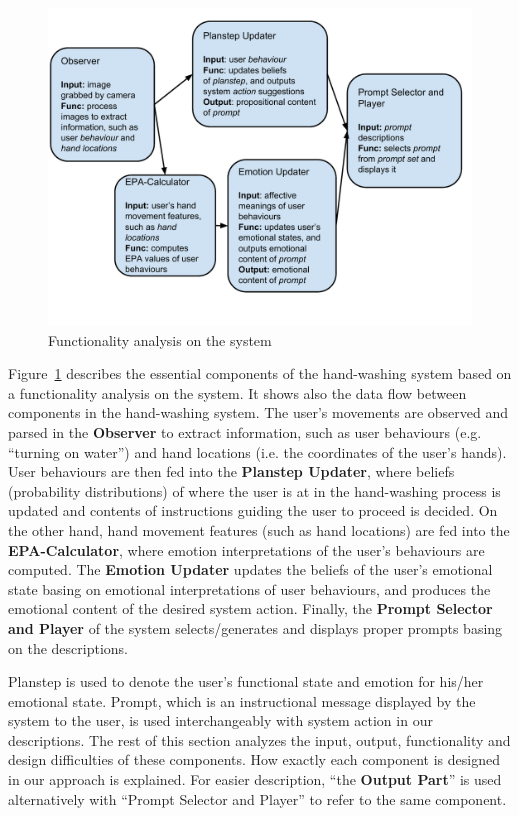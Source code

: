 \begin{figure}[h!]
\centering
\includegraphics[width=0.9\linewidth]{fig-components.pdf}
\caption{Functionality analysis on the system}
\label{fig:components}
\end{figure}

Figure~\ref{fig:components} describes the essential components of the hand-washing system based on a functionality analysis on the system. It shows also the data flow between components in the hand-washing system. The user's movements are observed and parsed in the \textbf{Observer} to extract information, such as user behaviours (e.g. ``turning on water'') and hand locations (i.e. the coordinates of the user's hands). User behaviours are then fed into the \textbf{Planstep Updater}, where beliefs (probability distributions) of where the user is at in the hand-washing process is updated and contents of instructions guiding the user to proceed is decided. On the other hand, hand movement features (such as hand locations) are fed into the \textbf{EPA-Calculator}, where emotion interpretations of the user's behaviours are computed. The \textbf{Emotion Updater} updates the beliefs of the user's emotional state basing on emotional interpretations of user behaviours, and produces the emotional content of the desired system action. Finally, the \textbf{Prompt Selector and Player} of the system selects/generates and displays proper prompts basing on the descriptions. 

Planstep is used to denote the user's functional state and emotion for his/her emotional state. Prompt, which is an instructional message displayed by the system to the user, is used interchangeably with system action in our descriptions. The rest of this section analyzes the input, output, functionality and design difficulties of these components. How exactly each component is designed in our approach is explained. For easier description, ``the \textbf{Output Part}'' is used alternatively with ``Prompt Selector and Player'' to refer to the same component.

